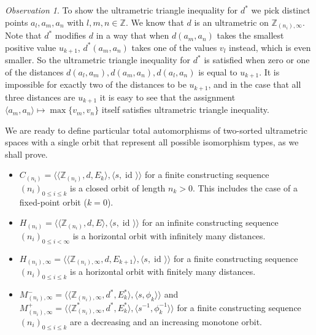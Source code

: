 \documentclass[10pt,a4paper]{article}
\theoremstyle{definition}
\theoremstyle{remark}
\newtheorem{observation}[tw]{Observation}
\newcommand \set [1]{\{#1\}}
\newcommand \seq [1]{\langle #1 \rangle}
\newcommand \id [1]{{\operatorname{id}_{#1}}}
\newcommand \Z {\mathbb{Z}}
\begin{document}
\begin{observation}
    To show the ultrametric triangle inequality for $d^*$ we pick distinct points $a_l, a_m, a_n$ with $l, m, n \in \Z$.
    We know that $d$ is an ultrametric on $\Z_{(n_i), \infty}$.
    Note that $d^*$ modifies $d$ in a way that when $d(a_m, a_n)$ takes the smallest positive value $u_{k + 1}$, $d^*(a_m, a_n)$ takes  one of the values $v_l$ instead,  which is even smaller.
    So the ultrametric triangle inequality for $d^*$ is satisfied when zero or one of the distances $d(a_l, a_m), d(a_m, a_n), d(a_l, a_n)$ is equal to $u_{k + 1}$.
    It is impossible for exactly two of the distances to be $u_{k + 1}$, and in the case that all three distances are $u_{k + 1}$ it is easy to see that the assignment $\seq{a_m, a_n} \mapsto \max\set{v_m, v_n}$ itself satisfies ultrametric triangle inequality.
\end{observation}

We are ready to define particular total automorphisms of two-sorted ultrametric spaces with a single orbit that represent all possible isomorphism types, as we shall prove.
\begin{itemize}
    \item $C_{(n_i)} = \seq{\seq{\Z_{(n_i)}, d, E_k}, \seq{s, \id{}}}$ for a finite constructing sequence $(n_i)_{0 \leq i \leq k}$ is a closed orbit of length $n_k > 0$.
    This includes the case of a fixed-point orbit ($k = 0$).
    
    \item $H_{(n_i)} = \seq{\seq{\Z_{(n_i)}, d, E}, \seq{s, \id{}}}$ for an infinite constructing sequence $(n_i)_{0 \leq i < \infty}$ is a horizontal orbit with infinitely many distances.

    \item $H_{(n_i), \infty} = \seq{\seq{\Z_{(n_i), \infty}, d, E_{k + 1}}, \seq{s, \id{}}}$ for a finite constructing sequence $(n_i)_{0 \leq i \leq k}$ is a horizontal orbit with finitely many distances.

    \item $M^-_{(n_i), \infty} = \seq{\seq{\Z_{(n_i), \infty}, d^*, E^*_k}, \seq{s, \phi_k}}$ 
    and $M^+_{(n_i), \infty} = \seq{\seq{\Z^*_{(n_i), \infty}, d^*, E^*_k}, \seq{s^{-1}, \phi_k^{-1}}}$ 
    for a finite constructing sequence $(n_i)_{0 \leq i \leq k}$ are a decreasing and an increasing monotone orbit.
\end{itemize}
\end{document}
